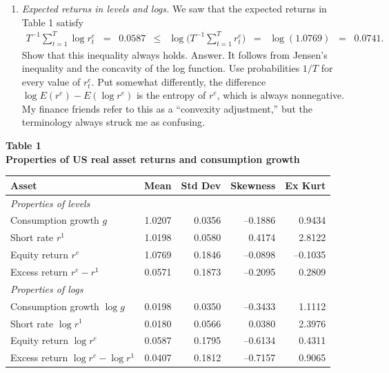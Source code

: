 \documentclass[11pt]{article}
\begin{document}
\begin{enumerate}
\item {\it Expected returns in levels and logs.\/}
We saw that the expected returns in Table 1 satisfy
\begin{eqnarray*}
    T^{-1} \sum_{t=1}^T \log r^e_t \;\;=\;\; 0.0587
        &\leq& \log \Big( T^{-1} \sum_{t=1}^T r^e_t \Big) \;\;=\;\; \log (1.0769)
        \;\;=\;\; 0.0741 .
\end{eqnarray*}
Show that this inequality always holds.
%
Answer.
It follows from Jensen's inequality and the concavity of the log function.
Use probabilities $1/T$ for every value of $r^e_t$.
Put somewhat differently, the difference
$ \log E (r^e) - E (\log r^e) $ is the entropy of $r^e$,
which is always nonnegative.
My finance friends refer to this as a ``convexity adjustment,''
but the terminology always struck me as confusing.



\end{enumerate}



\pagebreak
{\large\bf Table 1 \\ Properties of US real asset returns and consumption growth}

\bigskip
\tabcolsep=10pt
\begin{tabular}{lrrrr}
\toprule
Asset       & Mean  & Std Dev  & Skewness & Ex Kurt \\
\midrule
\multicolumn{3}{l}{\it Properties of levels} \\
Consumption growth $g$ \phantom{xxxxxxxxxxx}
                        & 1.0207  &  0.0356  & --0.1886 & 0.9434 \\
Short rate $r^1 $       & 1.0198  &  0.0580  &  0.4174  &  2.8122 \\
Equity return $r^e$     & 1.0769  &  0.1846  & --0.0898 & --0.1035 \\
Excess return $r^e-r^1$ & 0.0571  &  0.1873  & --0.2095 &   0.2809 \\
\midrule
\multicolumn{3}{l}{\it Properties of logs} \\
Consumption growth $\log g$  & 0.0198 & 0.0350 & --0.3433 & 1.1112  \\
Short rate $\log r^1 $       &  0.0180  & 0.0566  &  0.0380   & 2.3976 \\
Equity return $\log r^e$     &  0.0587  & 0.1795  & --0.6134  &  0.4311 \\
Excess return $\log r^e - \log r^1$ &  0.0407 & 0.1812 & --0.7157 & 0.9065 \\
\bottomrule
\end{tabular}
\end{document}
